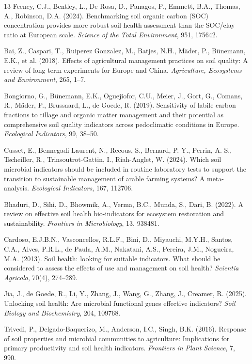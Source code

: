 \documentclass{ai4science_ysda}
\begin{document}
\begin{thebibliography}{13}
Feeney, C.J., Bentley, L., De Rosa, D., Panagos, P., Emmett, B.A., Thomas, A.,
Robinson, D.A. (2024). Benchmarking soil organic carbon (SOC) concentration
provides more robust soil health assessment than the SOC/clay ratio at European
scale. \emph{Science of the Total Environment}, 951, 175642.

Bai, Z., Caspari, T., Ruiperez Gonzalez, M., Batjes, N.H., Mäder, P.,
Bünemann, E.K., et al. (2018). Effects of agricultural management practices on
soil quality: A review of long-term experiments for Europe and China.
\emph{Agriculture, Ecosystems and Environment}, 265, 1--7.

Bongiorno, G., Bünemann, E.K., Oguejiofor, C.U., Meier, J., Gort, G., Comans, R.,
Mäder, P., Brussaard, L., de Goede, R. (2019). Sensitivity of labile carbon
fractions to tillage and organic matter management and their potential as
comprehensive soil quality indicators across pedoclimatic conditions in Europe.
\emph{Ecological Indicators}, 99, 38--50.

Cusset, E., Bennegadi-Laurent, N., Recous, S., Bernard, P.-Y., Perrin, A.-S.,
Tscheiller, R., Trinsoutrot-Gattin, I., Riah-Anglet, W. (2024). Which soil
microbial indicators should be included in routine laboratory tests to support
the transition to sustainable management of arable farming systems?
A meta-analysis. \emph{Ecological Indicators}, 167, 112706.

Bhaduri, D., Sihi, D., Bhowmik, A., Verma, B.C., Munda, S., Dari, B. (2022).
A review on effective soil health bio-indicators for ecosystem restoration and
sustainability. \emph{Frontiers in Microbiology}, 13, 938481.

Cardoso, E.J.B.N., Vasconcellos, R.L.F., Bini, D., Miyauchi, M.Y.H.,
Santos, C.A., Alves, P.R.L., de Paula, A.M., Nakatani, A.S., Pereira, J.M.,
Nogueira, M.A. (2013). Soil health: looking for suitable indicators. What
should be considered to assess the effects of use and management on soil
health? \emph{Scientia Agricola}, 70(4), 274--289.

Jia, J., de Goede, R., Li, Y., Zhang, J., Wang, G., Zhang, J., Creamer, R.
(2025). Unlocking soil health: Are microbial functional genes effective
indicators? \emph{Soil Biology and Biochemistry}, 204, 109768.

Trivedi, P., Delgado-Baquerizo, M., Anderson, I.C., Singh, B.K. (2016).
Response of soil properties and microbial communities to agriculture:
Implications for primary productivity and soil health indicators.
\emph{Frontiers in Plant Science}, 7, 990.


\end{thebibliography}
\end{document}
